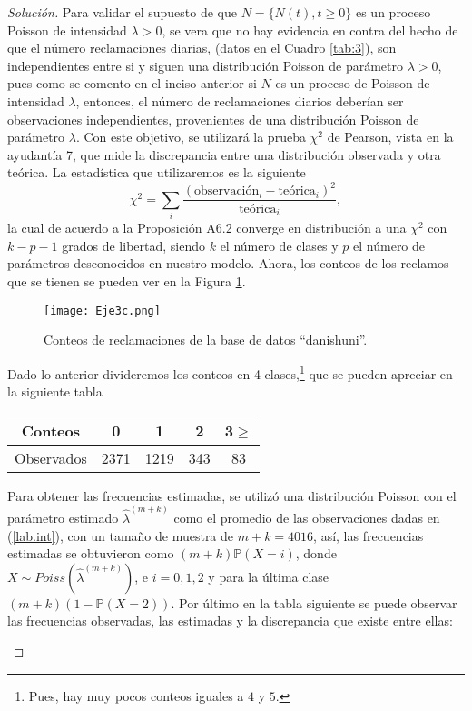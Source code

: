 \documentclass[10.5pt,notitlepage]{article}
\newenvironment{solucion}
  {\begin{proof}[Solución]}
  {\end{proof}}
\newcommand{\PP}{\mathbb{P}}
\theoremstyle{plain}
\begin{document}
\begin{solucion}
Para validar el supuesto de que $N=\{N(t), t\geq 0\}$ es un proceso Poisson de intensidad \(\lambda > 0\), se vera que no hay evidencia en contra del hecho de que el número reclamaciones diarias, (datos en el Cuadro \ref{tab:3}), son independientes entre si y siguen una distribución Poisson de parámetro \(\lambda >0\), pues como se comento en el inciso anterior si \(N\) es un proceso de Poisson de intensidad \(\lambda\), entonces, el número de reclamaciones diarios deberían ser observaciones independientes, provenientes de una distribución Poisson de parámetro \(\lambda\). Con este objetivo, se utilizará la prueba \(\chi^2\) de Pearson, vista en la ayudantía 7, que  mide la discrepancia entre una distribución observada y otra teórica. La estadística que utilizaremos es la siguiente
\[\chi^2=\sum_{i}\frac{(\text{observación}_i-\text{teórica}_i)^2}{\text{teórica}_i},\]
la cual de acuerdo a la Proposición A6.2 converge en distribución a una $\chi^2$ con $k - p - 1$ grados de libertad, siendo $k$ el número de clases y $p$ el número de parámetros desconocidos en nuestro modelo. Ahora, los conteos de los reclamos que se tienen se pueden ver en la Figura \ref{c.1}.
\begin{figure}[htb]
\centering
\texttt{[image: Eje3c.png]}
\caption{Conteos de reclamaciones de la base de datos “danishuni”.}
\label{c.1}
\end{figure}
Dado lo anterior divideremos los conteos en 4 clases,\footnote{Pues, hay muy pocos conteos iguales a \(4\) y \(5\).} que se pueden apreciar en la siguiente tabla
\begin{center}
\begin{tabular}{| c | c | c | c |c | }
\hline
Conteos & 0 & 1 & 2 & 3$\geq$ \\ \hline
Observados &  2371 &1219  &343 &  83 \\
 \hline
\end{tabular}
\end{center}
Para obtener las frecuencias estimadas, se utilizó una distribución Poisson con el parámetro estimado $\hat{\lambda}^{(m+k)}$ como el promedio de las observaciones dadas en (\ref{lab.int}), con un tamaño de muestra de $m+k=4016$, así, las frecuencias estimadas se obtuvieron como $(m+k)\PP(X=i)$, donde $X\sim Poiss(\hat{\lambda}^{(m+k)})$, e $i=0,1,2$ y para la última clase $(m+k)(1-\PP(X=2))$. Por último en la tabla siguiente se puede observar las frecuencias observadas, las estimadas y la discrepancia que existe entre ellas:
\begin{center}


\end{center}
\end{solucion}
\end{document}
